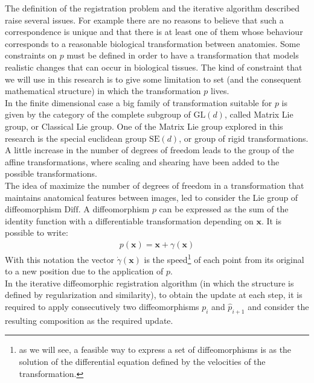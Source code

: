 The definition of the registration problem and the iterative algorithm described raise several issues. For example there are no reasons to believe that such a correspondence is unique and that there is at least one of them whose behaviour corresponds to a reasonable biological transformation between anatomies. 
Some constraints on $p$ must be defined in order to have a transformation that models realistic changes that can occur in biological tissues.
The kind of constraint that we will use in this research is to give some limitation to set (and the consequent mathematical structure) in which the transformation $p$ lives.\\
In the finite dimensional case a big family of transformation suitable for $p$ is given by the category of the complete subgroup of $\text{GL}(d)$, called Matrix Lie group, or Classical Lie group.
One of the Matrix Lie group explored in this research is the special euclidean group $\text{SE}(d)$, or group of rigid transformations.
A little increase in the number of degrees of freedom leads to the group of the affine transformations, where scaling and shearing have been added to the possible transformations. \\
The idea of maximize the number of degrees of freedom in a transformation that maintains anatomical features between images, led to consider the Lie group of diffeomorphism $\text{Diff}$.
A diffeomorphism $p$ can be expressed as the sum of the identity function with a differentiable transformation depending on $\mathbf{x}$. It is possible to write:
\begin{align*}
p(\mathbf{x})  = \mathbf{x} + \gamma(\mathbf{x})
\end{align*}
With this notation the vector $\dot{\gamma}(\mathbf{x})$ is the speed\footnote{as we will see, a feasible way to express a set of diffeomorphisms is as the solution of the differential equation defined by the velocities of the transformation.} of each point from its original to a new position due to the application of $p$.\\
In the iterative diffeomorphic registration algorithm (in which the structure is defined by regularization and similarity), to obtain the update at each step, it is required to apply consecutively two diffeomorphisms $p_{i}$ and  $\hat{p}_{i+1}$ and consider the resulting composition as the required update.
